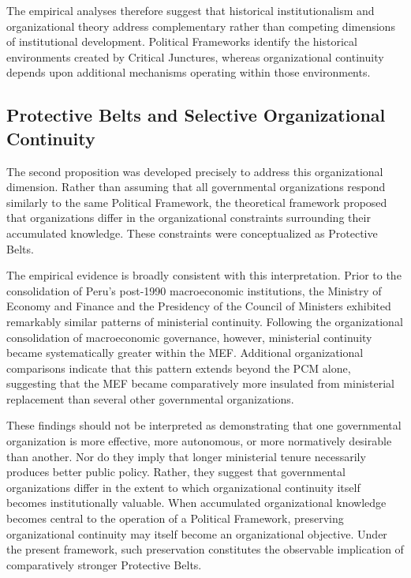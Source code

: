 \documentclass[doc, 12pt, a4paper,floatsintext]{apa7}
\begin{document}
The empirical analyses therefore suggest that historical institutionalism and organizational theory address complementary rather than competing dimensions of institutional development. Political Frameworks identify the historical environments created by Critical Junctures, whereas organizational continuity depends upon additional mechanisms operating within those environments.

\subsection{Protective Belts and Selective Organizational Continuity}

The second proposition was developed precisely to address this organizational dimension. Rather than assuming that all governmental organizations respond similarly to the same Political Framework, the theoretical framework proposed that organizations differ in the organizational constraints surrounding their accumulated knowledge. These constraints were conceptualized as Protective Belts.

The empirical evidence is broadly consistent with this interpretation. Prior to the consolidation of Peru's post-1990 macroeconomic institutions, the Ministry of Economy and Finance and the Presidency of the Council of Ministers exhibited remarkably similar patterns of ministerial continuity. Following the organizational consolidation of macroeconomic governance, however, ministerial continuity became systematically greater within the MEF. Additional organizational comparisons indicate that this pattern extends beyond the PCM alone, suggesting that the MEF became comparatively more insulated from ministerial replacement than several other governmental organizations.

These findings should not be interpreted as demonstrating that one governmental organization is more effective, more autonomous, or more normatively desirable than another. Nor do they imply that longer ministerial tenure necessarily produces better public policy. Rather, they suggest that governmental organizations differ in the extent to which organizational continuity itself becomes institutionally valuable. When accumulated organizational knowledge becomes central to the operation of a Political Framework, preserving organizational continuity may itself become an organizational objective. Under the present framework, such preservation constitutes the observable implication of comparatively stronger Protective Belts.
\end{document}
